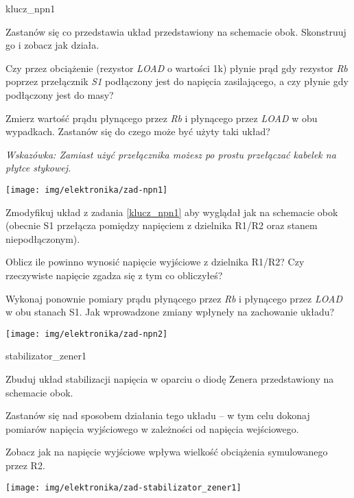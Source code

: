 \documentclass{pdfBooklets}
\begin{document}
\begin{Zadanie}{}{klucz_npn1}
\noindent\begin{minipage}[b]{0.6\textwidth}
Zastanów się co przedstawia układ przedstawiony na schemacie obok. Skonstruuj go i zobacz jak działa.

Czy przez obciążenie (rezystor \textit{LOAD} o wartości 1k) płynie prąd gdy rezystor \textit{Rb} poprzez przełącznik \textit{S1} podłączony jest do napięcia zasilającego, a czy płynie gdy podłączony jest do masy?

Zmierz wartość prądu płynącego przez \textit{Rb} i płynącego przez \textit{LOAD} w obu wypadkach. Zastanów się do czego może być użyty taki układ?

\textit{Wskazówka: Zamiast użyć przełącznika możesz po prostu przełączać kabelek na płytce stykowej.}
\end{minipage}
\hfill
\begin{minipage}[b]{0.35\textwidth}
\texttt{[image: img/elektronika/zad-npn1]}
\end{minipage}
\end{Zadanie}

\begin{Zadanie}{}{}
\noindent\begin{minipage}[b]{0.5\textwidth}
Zmodyfikuj układ z zadania \ref{klucz_npn1} aby wyglądał jak na schemacie obok (obecnie S1 przełącza pomiędzy napięciem z dzielnika R1/R2 oraz stanem niepodłączonym).

Oblicz ile powinno wynosić napięcie wyjściowe z dzielnika R1/R2? Czy rzeczywiste napięcie zgadza się z tym co obliczyłeś?

Wykonaj ponownie pomiary prądu płynącego przez \textit{Rb} i płynącego przez \textit{LOAD} w obu stanach S1.
Jak wprowadzone zmiany wpłyneły na zachowanie układu?
\end{minipage}
\hfill
\begin{minipage}[b]{0.45\textwidth}
\texttt{[image: img/elektronika/zad-npn2]}
\end{minipage}
\end{Zadanie}

\begin{Zadanie}{}{stabilizator_zener1}
\noindent\begin{minipage}[b]{0.77\textwidth}
Zbuduj układ stabilizacji napięcia w oparciu o diodę Zenera przedstawiony na schemacie obok.

Zastanów się nad sposobem działania tego układu – w tym celu dokonaj pomiarów napięcia wyjściowego w zależności od napięcia wejściowego.

Zobacz jak na napięcie wyjściowe wpływa wielkość obciążenia symulowanego przez R2.
\vspace{13pt}
\end{minipage}
\hfill
\begin{minipage}[b]{0.17\textwidth}
\texttt{[image: img/elektronika/zad-stabilizator\_zener1]}
\end{minipage}
\end{Zadanie}
\end{document}
